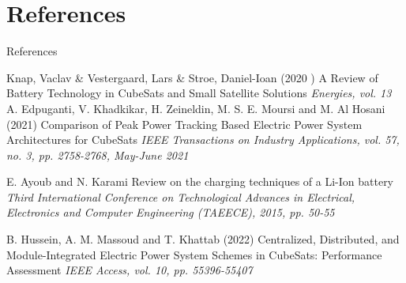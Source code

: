 \documentclass[aspectratio=169]{beamer}
\begin{document}
	\section{References}
	\begin{frame}[allowframebreaks]{References}
	
	\begin{thebibliography}{9}
			
		Knap, Vaclav \& Vestergaard, Lars \& Stroe, Daniel-Ioan (2020	)
		\newblock A Review of Battery Technology in CubeSats
		and Small Satellite Solutions
		\newblock \emph{Energies, vol. 13}	
			A. Edpuganti, V. Khadkikar, H. Zeineldin, M. S. E. Moursi and M. Al Hosani (2021)
			\newblock Comparison of Peak Power Tracking Based Electric Power System Architectures for CubeSats
			\newblock \emph{IEEE Transactions on Industry Applications, vol. 57, no. 3, pp. 2758-2768, May-June 2021}
			
		E. Ayoub and N. Karami 
		\newblock Review on the charging techniques of a Li-Ion battery
		\newblock \emph{Third International Conference on Technological Advances in Electrical, Electronics and Computer Engineering (TAEECE), 2015, pp. 50-55}
		
	
		
	B. Hussein, A. M. Massoud and T. Khattab (2022)
	\newblock Centralized, Distributed, and Module-Integrated Electric Power System Schemes in CubeSats: Performance Assessment
	\newblock \emph{ IEEE Access, vol. 10, pp. 55396-55407}
	
	






	\end{thebibliography}
	\end{frame}
	
	\begin{frame}
		
		
	\end{frame}
\end{document}

